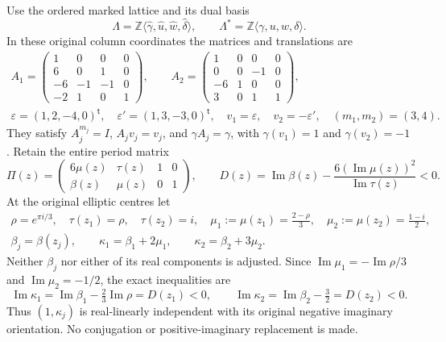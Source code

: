 Use the ordered marked lattice and its dual basis
\[
 \Lambda=\mathbb Z\langle\widehat\gamma,\widehat u,
            \widehat w,\widehat\delta\rangle,
 \qquad \Lambda^*=\mathbb Z\langle\gamma,u,w,\delta\rangle.
 \tag{FF1}\label{ffcert:eq:marking}
\]
In these original column coordinates the matrices and translations are
\[
\begin{gathered}
 A_1=\begin{pmatrix}1&0&0&0\\6&0&1&0\\-6&-1&-1&0\\-2&1&0&1\end{pmatrix},
 \qquad
 A_2=\begin{pmatrix}1&0&0&0\\0&0&-1&0\\-6&1&0&0\\3&0&1&1\end{pmatrix},\\
 \varepsilon=(1,2,-4,0)^{\mathsf t},\quad
 \varepsilon'=(1,3,-3,0)^{\mathsf t},\quad
 v_1=\varepsilon,\quad v_2=-\varepsilon',\quad (m_1,m_2)=(3,4).
\end{gathered}
\tag{FF2}\label{ffcert:eq:matrices-translations}
\]
They satisfy $A_j^{m_j}=I$, $A_jv_j=v_j$, and
$\gamma A_j=\gamma$, with $\gamma(v_1)=1$ and $\gamma(v_2)=-1$.
Retain the entire period matrix
\[
 \Pi(z)=\begin{pmatrix}6\mu(z)&\tau(z)&1&0\\
                         \beta(z)&\mu(z)&0&1\end{pmatrix},
 \qquad
 D(z)=\operatorname{Im}\beta(z)
       -\frac{6(\operatorname{Im}\mu(z))^2}{\operatorname{Im}\tau(z)}<0.
 \tag{FF3}\label{ffcert:eq:periods}
\]
At the original elliptic centres let
\[
\begin{gathered}
 \rho=e^{\pi i/3},\quad \tau(z_1)=\rho,\quad \tau(z_2)=i,
 \quad \mu_1:=\mu(z_1)=\frac{2-\rho}{3},\quad
 \mu_2:=\mu(z_2)=\frac{1-i}{2},\\
 \beta_j=\beta(z_j),\qquad
 \kappa_1=\beta_1+2\mu_1,\qquad
 \kappa_2=\beta_2+3\mu_2.
\end{gathered}
\tag{FF4}\label{ffcert:eq:central-parameters}
\]
Neither $\beta_j$ nor either of its real components is adjusted.
Since $\operatorname{Im}\mu_1=-\operatorname{Im}\rho/3$ and
$\operatorname{Im}\mu_2=-1/2$, the exact inequalities are
\[
 \operatorname{Im}\kappa_1
 =\operatorname{Im}\beta_1-\tfrac23\operatorname{Im}\rho=D(z_1)<0,
 \qquad
 \operatorname{Im}\kappa_2
 =\operatorname{Im}\beta_2-\tfrac32=D(z_2)<0.
 \tag{FF5}\label{ffcert:eq:negative-orientation}
\]
Thus $(1,\kappa_j)$ is real-linearly independent with its original
negative imaginary orientation. No conjugation or positive-imaginary
replacement is made.

